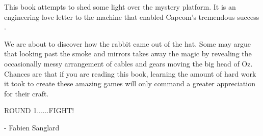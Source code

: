 This book attempts to shed some light over the mystery platform. It is an engineering love letter to the machine that enabled Capcom's tremendous success . 

We are about to discover how the rabbit came out of the hat. Some may argue that looking past the smoke and mirrors takes away the magic by revealing the occasionally messy arrangement of cables and gears moving the big head of Oz. Chances are that if you are reading this book, learning the amount of hard work it took to create these amazing games will only command a greater appreciation for their craft.

ROUND 1......FIGHT!

- Fabien Sanglard